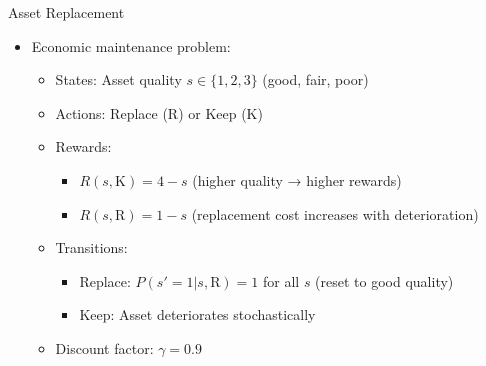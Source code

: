 \documentclass[10pt]{beamer}
\begin{document}

\begin{frame}{Asset Replacement}
    \begin{itemize}
        \item Economic maintenance problem:
        \begin{itemize}
            \item States: Asset quality $s \in \{1,2,3\}$ (good, fair, poor)
            \item Actions: Replace (R) or Keep (K)
            \item Rewards:
            \begin{itemize}
                \item $R(s,\text{K}) = 4-s$ (higher quality → higher rewards)
                \item $R(s,\text{R}) = 1-s$ (replacement cost increases with deterioration)
            \end{itemize}
            \item Transitions:
            \begin{itemize}
                \item Replace: $P(s'=1|s,\text{R})=1$ for all $s$ (reset to good quality)
                \item Keep: Asset deteriorates stochastically
            \end{itemize}
            \item Discount factor: $\gamma = 0.9$
        \end{itemize}
    \end{itemize}
\end{frame}
\end{document}
